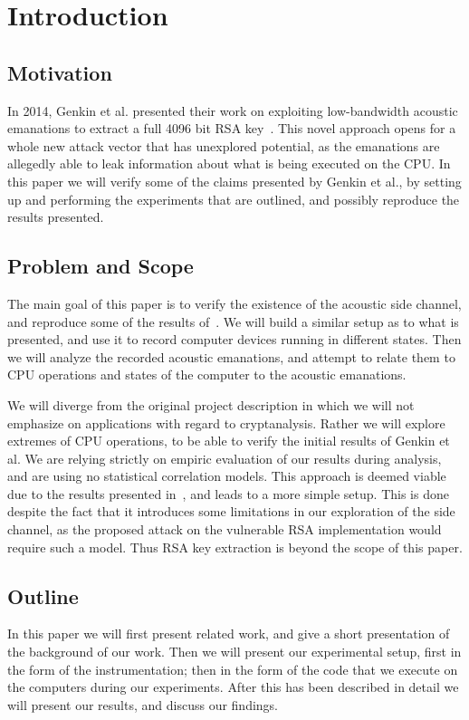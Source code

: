 \chapter{Introduction}\label{chp:introduction} 

\section{Motivation}
In 2014, Genkin et al. presented their work on exploiting low-bandwidth acoustic emanations to extract a full 4096 bit RSA key~\cite{DBLP:conf/crypto/GenkinST14}.
This novel approach opens for a whole new attack vector that has unexplored potential, as the emanations are allegedly able to leak information about what is being executed on the CPU.
In this paper we will verify some of the claims presented by Genkin et al., by setting up and performing the experiments that are outlined, and possibly reproduce the results presented.

\section{Problem and Scope}
The main goal of this paper is to verify the existence of the acoustic side channel, and reproduce some of the results of~\cite{DBLP:conf/crypto/GenkinST14}.
We will build a similar setup as to what is presented, and use it to record computer devices running in different states.
Then we will analyze the recorded acoustic emanations, and attempt to relate them to CPU operations and states of the computer to the acoustic emanations.

We will diverge from the original project description in which we will not emphasize on applications with regard to cryptanalysis.
Rather we will explore extremes of CPU operations, to be able to verify the initial results of Genkin et al.
We are relying strictly on empiric evaluation of our results during analysis, and are using no statistical correlation models.
This approach is deemed viable due to the results presented in~\cite{DBLP:conf/crypto/GenkinST14}, and leads to a more simple setup.
This is done despite the fact that it introduces some limitations in our exploration of the side channel, as the proposed attack on the vulnerable RSA implementation would require such a model.
Thus RSA key extraction is beyond the scope of this paper.



\section{Outline}
In this paper we will first present related work, and give a short presentation of the background of our work.
Then we will present our experimental setup, first in the form of the instrumentation; then in the form of the code that we execute on the computers during our experiments.
After this has been described in detail we will present our results, and discuss our findings.